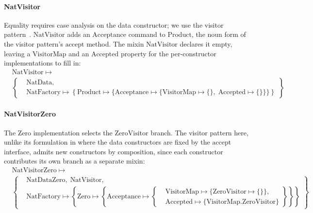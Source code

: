 \paragraph{NatVisitor}
Equality requires case analysis on the data constructor; we use the
visitor pattern~\cite{gamma1994-design-patterns}.
$\mathrm{NatVisitor}$ adds an $\mathrm{Acceptance}$ command to $\mathrm{Product}$,
the noun form of the visitor pattern's $\mathrm{accept}$ method.
The mixin $\mathrm{NatVisitor}$ declares it empty, leaving a $\mathrm{VisitorMap}$ and an
$\mathrm{Accepted}$ property for the per-constructor implementations to fill in:
\[
  \begin{aligned}
    &\mathrm{NatVisitor} \mapsto \\
    &\left\{
    \begin{aligned}
      &\mathrm{NatData},\\
      &\mathrm{NatFactory} \mapsto \left\{\mathrm{Product} \mapsto \{\mathrm{Acceptance} \mapsto \{\mathrm{VisitorMap} \mapsto \{\},\; \mathrm{Accepted} \mapsto \{\}\}\}\right\}
  \end{aligned}\right\}
  \end{aligned}
\]

\paragraph{NatVisitorZero}
The $\mathrm{Zero}$ implementation selects the $\mathrm{ZeroVisitor}$ branch.
The visitor pattern here, unlike its formulation in
\cite{gamma1994-design-patterns} where the data constructors are fixed by the
$\mathrm{accept}$ interface, admits new constructors by composition, since each
constructor contributes its own branch as a separate mixin:
\[
  \begin{aligned}
    &\mathrm{NatVisitorZero} \mapsto \\
    &\left\{
    \begin{aligned}
      &\mathrm{NatDataZero},\; \mathrm{NatVisitor},\\
      &\mathrm{NatFactory} \mapsto \left\{\mathrm{Zero} \mapsto \left\{\mathrm{Acceptance} \mapsto \left\{
                \begin{aligned}
                  &\mathrm{VisitorMap} \mapsto \{\mathrm{ZeroVisitor} \mapsto \{\}\},\\
                  &\mathrm{Accepted} \mapsto \{\mathrm{VisitorMap}.\mathrm{ZeroVisitor}\}
              \end{aligned}\right\}\right\}\right\}
  \end{aligned}\right\}
  \end{aligned}
\]

